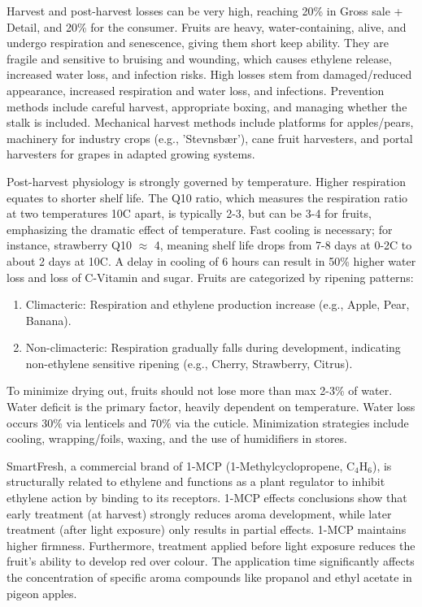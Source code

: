 \vspace{0.5em}
Harvest and post-harvest losses can be very high, reaching 20\% in Gross sale + Detail, and 20\% for the consumer. Fruits are heavy, water-containing, alive, and undergo respiration and senescence, giving them short keep ability. They are fragile and sensitive to bruising and wounding, which causes ethylene release, increased water loss, and infection risks. High losses stem from damaged/reduced appearance, increased respiration and water loss, and infections. Prevention methods include careful harvest, appropriate boxing, and managing whether the stalk is included. Mechanical harvest methods include platforms for apples/pears, machinery for industry crops (e.g., 'Stevnsbær'), cane fruit harvesters, and portal harvesters for grapes in adapted growing systems.

\vspace{0.5em}
Post-harvest physiology is strongly governed by temperature. Higher respiration equates to shorter shelf life. The Q10 ratio, which measures the respiration ratio at two temperatures 10\textdegree C apart, is typically 2-3, but can be 3-4 for fruits, emphasizing the dramatic effect of temperature. Fast cooling is necessary; for instance, strawberry Q10 $\approx$ 4, meaning shelf life drops from 7-8 days at 0-2\textdegree C to about 2 days at 10\textdegree C. A delay in cooling of 6 hours can result in 50\% higher water loss and loss of C-Vitamin and sugar. Fruits are categorized by ripening patterns: \begin{enumerate} \item Climacteric: Respiration and ethylene production increase (e.g., Apple, Pear, Banana). \item Non-climacteric: Respiration gradually falls during development, indicating non-ethylene sensitive ripening (e.g., Cherry, Strawberry, Citrus). \end{enumerate} To minimize drying out, fruits should not lose more than max 2-3\% of water. Water deficit is the primary factor, heavily dependent on temperature. Water loss occurs 30\% via lenticels and 70\% via the cuticle. Minimization strategies include cooling, wrapping/foils, waxing, and the use of humidifiers in stores.

\vspace{0.5em}
SmartFresh, a commercial brand of 1-MCP (1-Methylcyclopropene, C$_4$H$_6$), is structurally related to ethylene and functions as a plant regulator to inhibit ethylene action by binding to its receptors. 1-MCP effects conclusions show that early treatment (at harvest) strongly reduces aroma development, while later treatment (after light exposure) only results in partial effects. 1-MCP maintains higher firmness. Furthermore, treatment applied before light exposure reduces the fruit’s ability to develop red over colour. The application time significantly affects the concentration of specific aroma compounds like propanol and ethyl acetate in pigeon apples.